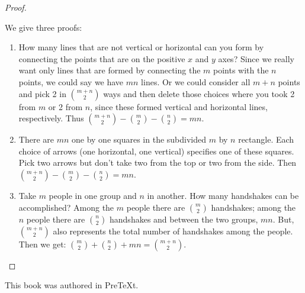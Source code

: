 \documentclass[10pt,]{book}
\theoremstyle{plain}
\theoremstyle{definition}
\theoremstyle{definition}
\numberwithin{equation}{chapter}
\begin{document}
\begin{proof}\hypertarget{proof-22}{}
\hypertarget{p-333}{}%
We give three proofs: \leavevmode%
\begin{enumerate}
\item\hypertarget{li-68}{}\hypertarget{p-334}{}%
How many lines that are not vertical or horizontal can you form by connecting the points that are on the positive \(x\) and \(y\) axes? Since we really want only lines that are formed by connecting the \(m\) points with the \(n\) points, we could say we have \(mn\) lines. Or we could consider all \(m + n\) points and pick 2 in \(\binom{m+n}{2}\) ways and then delete those choices where you took 2 from \(m\) or 2 from \(n\), since these formed vertical and horizontal lines, respectively.  Thus \(\binom{m + n}{2} - \binom{m}{2} - \binom{n}{2} = mn\).%
\item\hypertarget{li-69}{}\hypertarget{p-335}{}%
There are \(mn\) one by one squares in the subdivided \(m\) by \(n\) rectangle.  Each choice of arrows (one horizontal, one vertical) specifies one of these squares.  Pick two arrows but don't take two from the top or two from the side.  Then \(\binom{m + n}{2} - \binom{m}{2} - \binom{n}{2} = mn\).%
\item\hypertarget{li-70}{}\hypertarget{p-336}{}%
Take \(m\) people in one group and \(n\) in another. How many handshakes can be accomplished? Among the \(m\) people there are \(\binom{m}{2}\) handshakes; among the \(n\) people there are \(\binom{n}{2}\) handshakes and between the two groups, \(mn\). But, \(\binom{m + n}{2}\) also represents the total number of handshakes among the people. Then we get: \(\binom{m}{2} + \binom{n}{2} + mn = \binom{m + n}{2}\).%
\end{enumerate}
%
\end{proof}
%
\backmatter
%
%
%
\cleardoublepage
\pagestyle{empty}
\hypertarget{colophon-2}{}
\centerline{\hypertarget{p-337}{}%
This book was authored in PreTeXt.%
}
\end{document}

